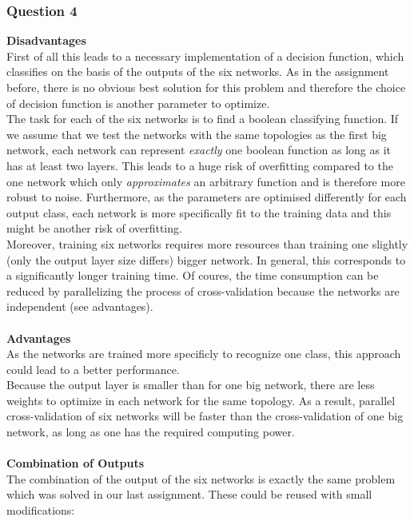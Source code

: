 \documentclass{article}
\begin{document}
\subsubsection*{Question 4}
\textbf{Disadvantages} \\
First of all this leads to a necessary implementation of a decision function, which classifies on the basis of the outputs of the six networks. As in the assignment before, there is no obvious best solution for this problem and therefore the choice of decision function is another parameter to optimize.\\
The task for each of the six networks is to find a boolean classifying function. If we assume that we test the networks with the same topologies as the first big network, each network can represent \textit{exactly} one boolean function as long as it has at least two layers. This leads to a huge risk of overfitting compared to the one network which only \textit{approximates} an arbitrary function and is therefore more robust to noise. Furthermore, as the parameters are optimised differently for each output class, each network is more specifically fit to the training data and this might be another risk of overfitting.\\
Moreover, training six networks requires more resources than training one slightly (only the output layer size differs) bigger network. In general, this corresponds to a significantly longer training time. Of coures, the time consumption can be reduced by parallelizing the process of cross-validation because the networks are independent (see advantages).\\
\\
\textbf{Advantages} \\
As the networks are trained more specificly to recognize one class, this approach could lead to a better performance.\\
Because the output layer is smaller than for one big network, there are less weights to optimize in each network for the same topology. As a result, parallel cross-validation of six networks will be faster than the cross-validation of one big network, as long as one has the required computing power.\\
\\
\textbf{Combination of Outputs} \\
The combination of the output of the six networks is exactly the same problem which was solved in our last assignment. These could be reused with small modifications: 
\end{document}

